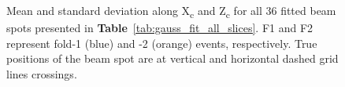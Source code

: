 \begin{figure}
\centering
{}
\caption{Mean and standard deviation along X\textsubscript{c} and Z\textsubscript{c} for all 36 fitted beam spots presented in \textbf{Table}~\ref{tab:gauss_fit_all_slices}. F1 and F2 represent fold-1 (blue) and -2 (orange) events, respectively. True positions of the beam spot are at vertical and horizontal dashed grid lines crossings.}
\label{fig:18pts_gaussian_beam_spot}       %
\end{figure}


